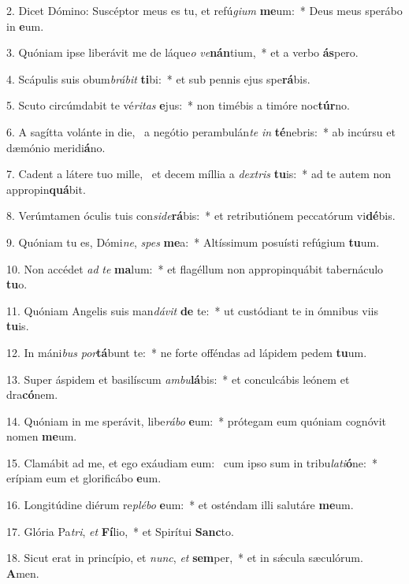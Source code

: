 2. Dicet Dómino: Suscéptor meus es tu, et refú\textit{gi}\textit{um} \textbf{me}um:~*  Deus meus sperábo in \textbf{e}um.\

3. Quóniam ipse liberávit me de láque\textit{o} \textit{ve}\textbf{nán}tium,~*  et a verbo \textbf{ás}pero.\

4. Scápulis suis obum\textit{brá}\textit{bit} \textbf{ti}bi:~*  et sub pennis ejus spe\textbf{rá}bis.\

5. Scuto circúmdabit te vé\textit{ri}\textit{tas} \textbf{e}jus:~*  non timébis a timóre noc\textbf{túr}no.\

6. A sagítta volánte in die, \dag\  a negótio perambulán\textit{te} \textit{in} \textbf{té}nebris:~*  ab incúrsu et dæmónio meridi\textbf{á}no.\

7. Cadent a látere tuo mille, \dag\  et decem míllia a \textit{dex}\textit{tris} \textbf{tu}is:~*  ad te autem non appropin\textbf{quá}bit.\

8. Verúmtamen óculis tuis con\textit{si}\textit{de}\textbf{rá}bis:~*  et retributiónem peccatórum vi\textbf{dé}bis.\

9. Quóniam tu es, Dómi\textit{ne}, \textit{spes} \textbf{me}a:~*  Altíssimum posuísti refúgium \textbf{tu}um.\

10. Non accédet \textit{ad} \textit{te} \textbf{ma}lum:~*  et flagéllum non appropinquábit tabernáculo \textbf{tu}o.\

11. Quóniam Angelis suis man\textit{dá}\textit{vit} \textbf{de} te:~*  ut custódiant te in ómnibus viis \textbf{tu}is.\

12. In máni\textit{bus} \textit{por}\textbf{tá}bunt te:~*  ne forte offéndas ad lápidem pedem \textbf{tu}um.\

13. Super áspidem et basilíscum \textit{am}\textit{bu}\textbf{lá}bis:~*  et conculcábis leónem et dra\textbf{có}nem.\

14. Quóniam in me sperávit, libe\textit{rá}\textit{bo} \textbf{e}um:~*  prótegam eum quóniam cognóvit nomen \textbf{me}um.\

15. Clamábit ad me, et ego exáudiam eum: \dag\  cum ipso sum in tribu\textit{la}\textit{ti}\textbf{ó}ne:~*  erípiam eum et glorificábo \textbf{e}um.\

16. Longitúdine diérum re\textit{plé}\textit{bo} \textbf{e}um:~*  et osténdam illi salutáre \textbf{me}um.\

17. Glória Pa\textit{tri}, \textit{et} \textbf{Fí}lio,~*  et Spirítui \textbf{Sanc}to.\

18. Sicut erat in princípio, et \textit{nunc}, \textit{et} \textbf{sem}per,~*  et in sǽcula sæculórum. \textbf{A}men.\


